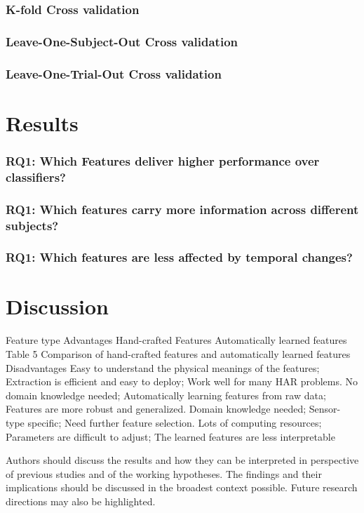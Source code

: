 \documentclass[journal,article,submit,moreauthors,pdftex]{Definitions/mdpi}
\begin{document}
\subsubsection{K-fold Cross validation}

\subsubsection{Leave-One-Subject-Out Cross validation}
\subsubsection{Leave-One-Trial-Out Cross validation}
\section{Results}

\subsubsection{RQ1: Which Features deliver higher performance over classifiers?}
\subsubsection{RQ1: Which features carry more information across different subjects?}
\subsubsection{RQ1: Which features are less affected by temporal changes?}

\section{Discussion}

Feature type Advantages
Hand-crafted Features
Automatically learned features
Table 5 Comparison of hand-crafted features and automatically learned features Disadvantages
Easy to understand the physical meanings of the features; Extraction is efficient and easy to deploy; Work well for many HAR problems.
No domain knowledge needed; Automatically learning features from raw data; Features are more robust and generalized.
Domain knowledge needed; Sensor-type specific; Need further feature selection.
Lots of computing resources; Parameters are difficult to adjust; The learned features are less interpretable


Authors should discuss the results and how they can be interpreted in perspective of previous studies and of the working hypotheses. The findings and their implications should be discussed in the broadest context possible. Future research directions may also be highlighted.
\end{document}
